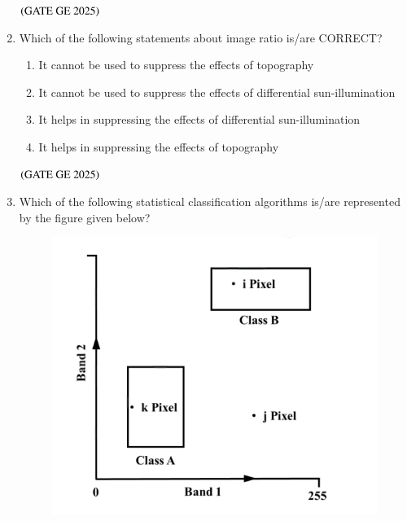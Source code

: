 \documentclass[journal,12pt,onecolumn]{IEEEtran}
\theoremstyle{remark}
\begin{document}
\begin{enumerate}
\begin{center}
\begin{tabular}{cc}
\end{tabular}
\end{center}
\begin{enumerate}
\end{enumerate}
\hfill $\left(\text{GATE GE 2025}\right)$
\bigskip
\item Which of the following statements about image ratio is/are CORRECT?
\begin{enumerate}
\item It cannot be used to suppress the effects of topography
\item It cannot be used to suppress the effects of differential sun-illumination
\item It helps in suppressing the effects of differential sun-illumination
\item It helps in suppressing the effects of topography
\end{enumerate}
\hfill $\left(\text{GATE GE 2025}\right)$
\bigskip
\item Which of the following statistical classification algorithms is/are represented by the figure given below?
\\
\begin{figure}[H]
    \centering
    \includegraphics[width=0.3\columnwidth]{figs/fig11.png}
    \caption{}
    \label{figs:fig11}
\end{figure}


\end{enumerate}
\end{document}

